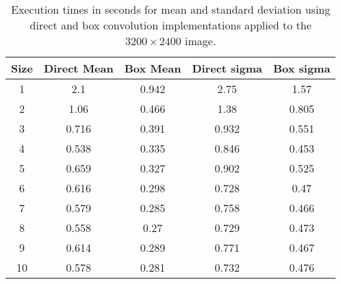 \documentclass{InsightArticle}
\begin{document}
\begin{table}[phtb]
\centering
\begin{tabular}{ccccc}
\hline
Size  &  Direct Mean &  Box Mean & Direct sigma & Box sigma\\
\hline
1	&	2.1	&	0.942	&	2.75	&	1.57	\\
2	&	1.06	&	0.466	&	1.38	&	0.805	\\
3	&	0.716	&	0.391	&	0.932	&	0.551	\\
4	&	0.538	&	0.335	&	0.846	&	0.453	\\
5	&	0.659	&	0.327	&	0.902	&	0.525	\\
6	&	0.616	&	0.298	&	0.728	&	0.47	\\
7	&	0.579	&	0.285	&	0.758	&	0.466	\\
8	&	0.558	&	0.27	&	0.729	&	0.473	\\
9	&	0.614	&	0.289	&	0.771	&	0.467	\\
10	&	0.578	&	0.281	&	0.732	&	0.476	\\
\hline
\hline
\end{tabular}
\caption{Execution times in seconds for mean and standard deviation using direct and box convolution implementations applied to the $3200 \times 2400$ image.\label{tab:perfBoxConv-threads}}
\end{table}
\end{document}
